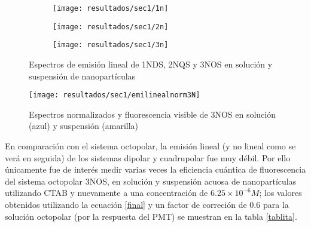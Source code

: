 \begin{figure}
\centering
\begin{subfigure}{\textwidth}
\centering
\texttt{[image: resultados/sec1/1n]}
\end{subfigure}
\begin{subfigure}{\textwidth}
\centering
\texttt{[image: resultados/sec1/2n]}
\end{subfigure}
\begin{subfigure}{\textwidth}
\centering
\texttt{[image: resultados/sec1/3n]}
\end{subfigure}
\caption{Espectros de emisi\'on lineal de 1NDS, 2NQS y 3NOS en soluci\'on y suspensi\'on de nanopart\'iculas}
\label{los3espemilineal}
\end{figure}



\begin{figure}[h]
\centering
\texttt{[image: resultados/sec1/emilinealnorm3N]}
\caption{Espectros normalizados y fluorescencia visible de 3NOS en soluci\'on (azul) y suspensi\'on (amarilla)}\label{3nsolsusp}
\end{figure}


En comparaci\'on con el sistema octopolar, la emisi\'on lineal (y no lineal como se ver\'a en seguida) de los sistemas dipolar y cuadrupolar fue muy d\'ebil. Por ello \'unicamente fue de inter\'es medir varias veces la eficiencia cu\'antica de fluorescencia del sistema octopolar 3NOS, en soluci\'on y suspensi\'on acuosa de nanopart\'iculas utilizando CTAB y nuevamente a una concentraci\'on de $6.25 \times 10^{-6} M$; los valores obtenidos utilizando la ecuaci\'on \ref{final} y un factor de correci\'on de 0.6 para la soluci\'on octopolar (por la respuesta del PMT) se muestran en la tabla \ref{tablita}. 

\begin{table}[H]
\centering
{} 
\caption{ Valores obtenidos de eficiencia cu\'antica de fluorescencia $\Phi$ para el sistema octopolar  \label{tablita}}
\end{table}


